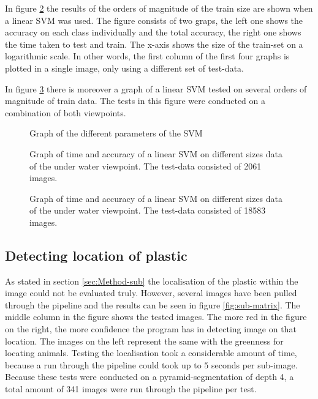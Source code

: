 In figure \ref{fig:lin1} the results of the orders of magnitude of the train size are shown when a linear SVM was used. The figure consists of two graps, the left one shows the accuracy on each class individually and the total accuracy, the right one shows the time taken to test and train. The x-axis shows the size of the train-set on a logarithmic scale.
In other words, the first column of the first four graphs is plotted in a single image, only using a different set of test-data.

In figure \ref{fig:lin2} there is moreover a graph of a linear SVM tested on several orders of magnitude of train data.
The tests in this figure were conducted on a combination of both viewpoints.

\begin{figure}[h!tb]
\centering
\ifx\showfig\undefined
 


 \fi
\caption{Graph of the different parameters of the SVM}
\label{fig:c14}
\end{figure}

\begin{figure}[h!tb]
\centering
\ifx\showfig\undefined
 \fi
\caption{Graph of time and accuracy of a linear SVM on different sizes data of the under water viewpoint. The test-data consisted of 2061 images.}
\label{fig:lin1}
\end{figure}

\begin{figure}[h!tb]
\centering
\ifx\showfig\undefined
 \fi
\caption{Graph of time and accuracy of a linear SVM on different sizes data of the under water viewpoint. The test-data consisted of 18583 images.}
\label{fig:lin2}
\end{figure}

\subsection{Detecting location of plastic}
\label{sec:Results-sub}
As stated in section \ref{sec:Method-sub} the localisation of the plastic within the image could not be evaluated truly.
However, several images have been pulled through the pipeline and the results can be seen in figure \ref{fig:sub-matrix}.
The middle column in the figure shows the tested images.
The more red in the figure on the right, the more confidence the program has in detecting image on that location.
The images on the left represent the same with the greenness for locating animals.
Testing the localisation took a considerable amount of time, because a run through the pipeline could took up to $5$ seconds per sub-image.
Because these tests were conducted on a pyramid-segmentation of depth 4, a total amount of 341 images were run through the pipeline per test.

